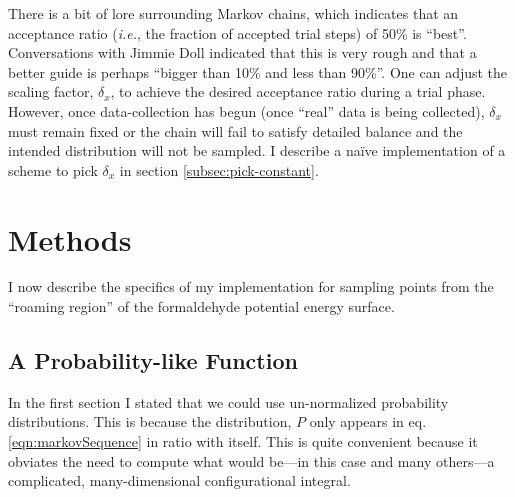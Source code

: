 \documentclass[letterpaper,12pt]{article}
\newcommand{\refeq}[1]{eq. \ref{eqn:#1}}
\begin{document}
There is a bit of lore surrounding Markov chains, which indicates that an acceptance ratio (\emph{i.e.}, the fraction of accepted trial steps) of 50\% is ``best''. Conversations with Jimmie Doll indicated that this is very rough and that a better guide is perhaps ``bigger than 10\% and less than 90\%''. One can adjust the scaling factor, ${\delta}_{x}$, to achieve the desired acceptance ratio during a trial phase. However, once data-collection has begun (once ``real'' data is being collected), ${\delta}_{x}$ must remain fixed or the chain will fail to satisfy detailed balance and the intended distribution will not be sampled. I describe a na\"{i}ve implementation of a scheme to pick  ${\delta}_{x}$ in section \ref{subsec:pick-constant}.

\section{Methods}\label{sec:implementation}
I now describe the specifics of my implementation for sampling points from the ``roaming region'' of the formaldehyde potential energy surface.

\subsection{A Probability-like Function}\label{subsec:pfunc}
In the first section I stated that we could use un-normalized probability distributions. This is because the distribution, $P$ only appears in \refeq{markovSequence} in ratio with itself. This is quite convenient because it obviates the need to compute what would be---in this case and many others---a complicated, many-dimensional configurational integral.
\end{document}
